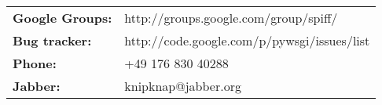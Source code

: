 \begin{tabular}{ll}
{\bf Google Groups:} & http://groups.google.com/group/spiff/ \\
{\bf Bug tracker:}   & http://code.google.com/p/pywsgi/issues/list \\
{\bf Phone:}         & +49 176 830 40288 \\
{\bf Jabber:}        & knipknap@jabber.org
\end{tabular}
